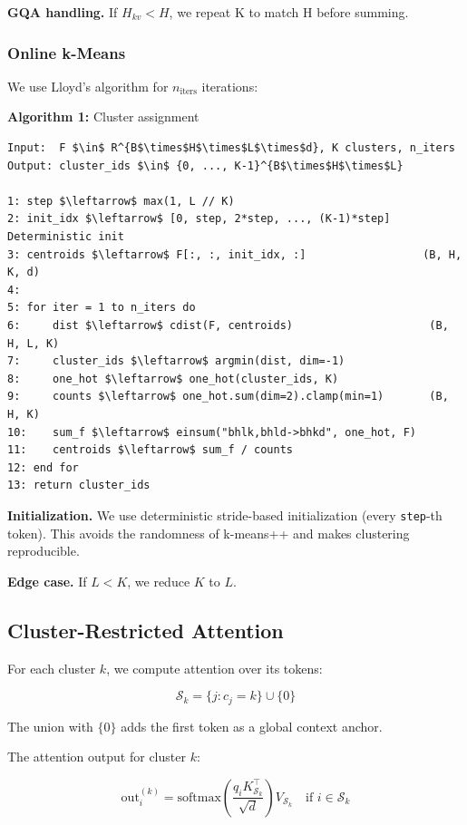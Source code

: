 \textbf{GQA handling.} If $H_{kv} < H$, we repeat K to match H before summing.

\subsubsection{Online k-Means}

We use Lloyd's algorithm for $n_{\text{iters}}$ iterations:

\textbf{Algorithm 1:} Cluster assignment
\begin{lstlisting}
Input:  F $\in$ R^{B$\times$H$\times$L$\times$d}, K clusters, n_iters
Output: cluster_ids $\in$ {0, ..., K-1}^{B$\times$H$\times$L}

1: step $\leftarrow$ max(1, L // K)
2: init_idx $\leftarrow$ [0, step, 2*step, ..., (K-1)*step]    Deterministic init
3: centroids $\leftarrow$ F[:, :, init_idx, :]                  (B, H, K, d)
4:
5: for iter = 1 to n_iters do
6:     dist $\leftarrow$ cdist(F, centroids)                     (B, H, L, K)
7:     cluster_ids $\leftarrow$ argmin(dist, dim=-1)
8:     one_hot $\leftarrow$ one_hot(cluster_ids, K)
9:     counts $\leftarrow$ one_hot.sum(dim=2).clamp(min=1)       (B, H, K)
10:    sum_f $\leftarrow$ einsum("bhlk,bhld->bhkd", one_hot, F)
11:    centroids $\leftarrow$ sum_f / counts
12: end for
13: return cluster_ids
\end{lstlisting}

\textbf{Initialization.} We use deterministic stride-based initialization (every 
\texttt{step}-th token). This avoids the randomness of k-means++ and makes 
clustering reproducible.

\textbf{Edge case.} If $L < K$, we reduce $K$ to $L$.

\subsection{Cluster-Restricted Attention}

For each cluster $k$, we compute attention over its tokens:

\[
\mathcal{S}_k = \{j : c_j = k\} \cup \{0\}
\tag{4.2}
\]

The union with $\{0\}$ adds the first token as a global context anchor.

The attention output for cluster $k$:

\[
\text{out}_i^{(k)} = \text{softmax}\!\left(\frac{q_i K_{\mathcal{S}_k}^\top}{\sqrt{d}}\right) V_{\mathcal{S}_k} \quad \text{if } i \in \mathcal{S}_k
\tag{4.3}
\]

